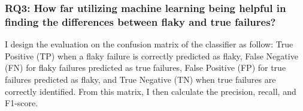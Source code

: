 















\subsubsection{RQ3: How far utilizing machine learning being helpful in finding the differences between flaky and true failures?}
\label{matchingRQ3}



I design the evaluation on the confusion matrix of the classifier as follow: True Positive (TP) when a flaky failure is correctly predicted as flaky, False Negative (FN) for flaky failures predicted as true failures, False Positive (FP) for true failures predicted as flaky, and True Negative (TN) when true failures are correctly identified. From this matrix, I then calculate the precision, recall, and F1-score.

